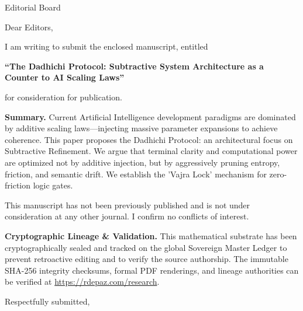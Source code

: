 \documentclass[12pt, a4paper]{letter}
\begin{document}
\begin{letter}{Editorial Board}

\opening{Dear Editors,}

I am writing to submit the enclosed manuscript, entitled

\begin{center}
\textbf{``The Dadhichi Protocol: Subtractive System Architecture as a Counter to AI Scaling Laws''}
\end{center}

\noindent for consideration for publication.

\medskip

\textbf{Summary.} Current Artificial Intelligence development paradigms are dominated by additive scaling laws—injecting massive parameter expansions to achieve coherence. This paper proposes the Dadhichi Protocol: an architectural focus on Subtractive Refinement. We argue that terminal clarity and computational power are optimized not by additive injection, but by aggressively pruning entropy, friction, and semantic drift. We establish the 'Vajra Lock' mechanism for zero-friction logic gates.

\medskip

This manuscript has not been previously published and is not under consideration
at any other journal. I confirm no conflicts of interest.

\textbf{Cryptographic Lineage \& Validation.} This mathematical substrate has been cryptographically sealed and tracked on the global Sovereign Master Ledger to prevent retroactive editing and to verify the source authorship. The immutable SHA-256 integrity checksums, formal PDF renderings, and lineage authorities can be verified at \url{https://rdepaz.com/research}.

\medskip

\closing{Respectfully submitted,}
\end{letter}
\end{document}
